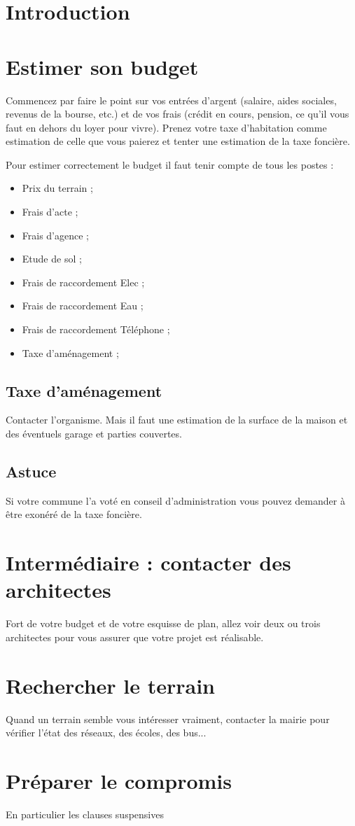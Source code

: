 \documentclass[french]{article}
\begin{document}
\section{Introduction}
\section{Estimer son budget}
Commencez par faire le point sur vos entrées d'argent (salaire, aides sociales, revenus de la bourse, etc.) et de vos frais (crédit en cours, pension, ce qu'il vous faut en dehors du loyer pour vivre). Prenez votre taxe d'habitation comme estimation de celle que vous paierez et tenter une estimation de la taxe foncière.

Pour estimer correctement le budget il faut tenir compte de tous les postes :
\begin{itemize}
\item Prix du terrain ;
\item Frais d'acte ;
\item Frais d'agence ;
\item Etude de sol ;
\item Frais de raccordement Elec ;
\item Frais de raccordement Eau ;
\item Frais de raccordement Téléphone ;
\item Taxe d'aménagement ;
\end{itemize}

\subsection{Taxe d'aménagement}
Contacter l'organisme. Mais il faut une estimation de la surface de la maison et des éventuels garage et parties couvertes.

\subsection{Astuce}
Si votre commune l'a voté en conseil d'administration vous pouvez demander à être exonéré de la taxe foncière.

\section{Intermédiaire : contacter des architectes}
Fort de votre budget et de votre esquisse de plan, allez voir deux ou trois architectes pour vous assurer que votre projet est réalisable.

\section{Rechercher le terrain}
Quand un terrain semble vous intéresser vraiment, contacter la mairie pour vérifier l'état des réseaux, des écoles, des bus...

\section{Préparer le compromis}
En particulier les clauses suspensives
\end{document}
